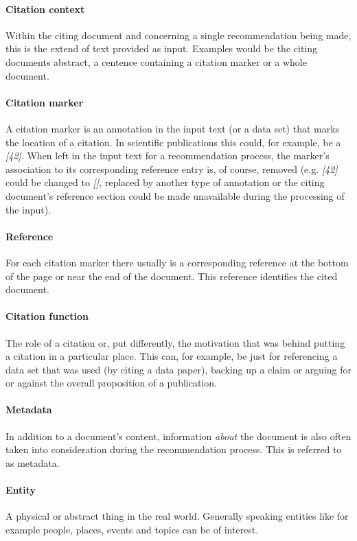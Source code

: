 \documentclass{proseminar}
\begin{document}
\paragraph{Citation context}
Within the citing document and concerning a single recommendation being made, this is the extend of text provided as input. Examples would be the citing documents abstract, a centence containing a citation marker or a whole document.

\paragraph{Citation marker}
A citation marker is an annotation in the input text (or a data set) that marks the location of a citation. In scientific publications this could, for example, be a \emph{[42]}. When left in the input text for a recommendation process, the marker's association to its corresponding reference entry is, of course, removed (e.g. \emph{[42]} could be changed to \emph{[]}, replaced by another type of annotation or the citing document's reference section could be made unavailable during the processing of the input).

\paragraph{Reference}
For each citation marker there usually is a corresponding reference at the bottom of the page or near the end of the document. This reference identifies the cited document.

\paragraph{Citation function}
The role of a citation or, put differently, the motivation that was behind putting a citation in a particular place. This can, for example, be just for referencing a data set that was used (by citing a data paper), backing up a claim or arguing for or against the overall proposition of a publication.

\paragraph{Metadata}
In addition to a document's content, information \emph{about} the document is also often taken into consideration during the recommendation process. This is referred to as metadata.

\paragraph{Entity}
A physical or abstract thing in the real world. Generally speaking entities like for example people, places, events and topics can be of interest.
\end{document}
